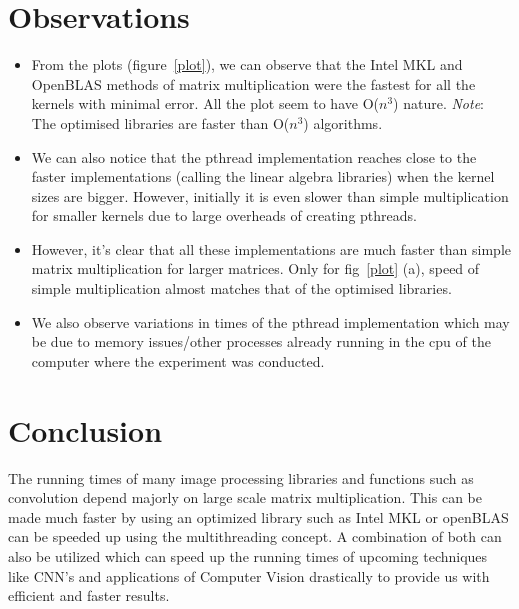\documentclass{article}
\begin{document}
\section{Observations}

\begin{itemize}
\item From the plots (figure~\ref{plot}), we can observe that the Intel MKL \cite{intelmkl} and OpenBLAS \cite{OpenBLAS} methods of matrix multiplication were the fastest for all the kernels with minimal error. All the plot seem to have O(\(n^3\)) nature. \emph{Note}: The optimised libraries are faster than O(\(n^3\)) algorithms.
\item  We can also notice that the pthread implementation reaches close to the faster implementations (calling the linear algebra libraries) when the kernel sizes are bigger. However, initially  it is even slower than simple multiplication for smaller kernels due to large overheads of creating pthreads.
\item However, it's clear that all these implementations are much faster than simple matrix multiplication for larger matrices. Only for fig~\ref{plot} (a), speed of simple multiplication almost matches that of the optimised libraries.
\item We also observe variations in times of the pthread implementation which may be due to memory issues/other processes already running in the cpu of the computer where the experiment was conducted.
\end{itemize}

\section{Conclusion}
The running times of many image processing libraries and functions such as convolution depend majorly on large scale matrix multiplication. This can be made much faster by using an optimized library such as Intel MKL \cite{intelmkl} or openBLAS \cite{OpenBLAS} can be speeded up using the multithreading concept. A combination of both can also be utilized which can speed up the running times of upcoming techniques like CNN's and applications of Computer Vision drastically to provide us with efficient and faster results.




\end{document}
